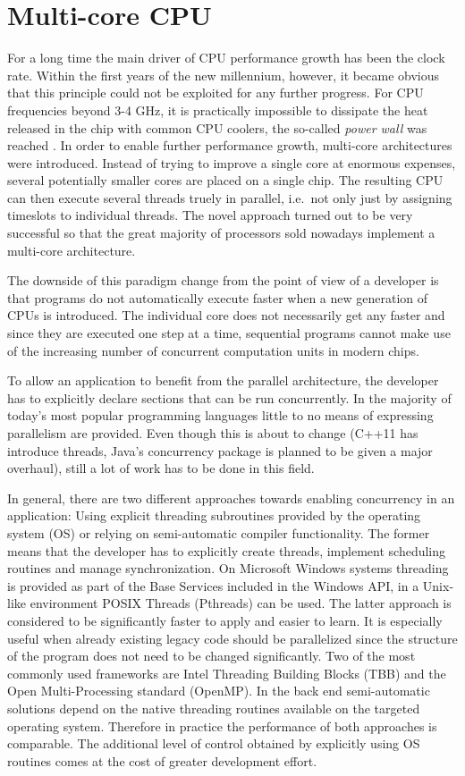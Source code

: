 \section{Multi-core CPU}
For a long time the main driver of CPU performance growth has been the clock rate. Within the first years of the new millennium, however, it became obvious that this principle could not be exploited for any further progress. For CPU frequencies beyond 3-4 GHz, it is practically impossible to dissipate the heat released in the chip with common CPU coolers, the so-called \textit{power wall} was reached \cite{kuroda_cmos_2001}. In order to enable further performance growth, multi-core architectures were introduced. Instead of trying to improve a single core at enormous expenses, several potentially smaller cores are placed on a single chip. The resulting CPU can then execute several threads truely in parallel, i.e.\ not only just by assigning timeslots to individual threads. The novel approach turned out to be very successful so that the great majority of processors sold nowadays implement a multi-core architecture. 

The downside of this paradigm change from the point of view of a developer is that programs do not automatically execute faster when a new generation of CPUs is introduced. The individual core does not necessarily get any faster and since they are executed one step at a time, sequential programs cannot make use of the increasing number of concurrent computation units in modern chips. 

To allow an application to benefit from the parallel architecture, the developer has to explicitly declare sections that can be run concurrently. In the majority of today's most popular programming languages little to no means of expressing parallelism are provided. Even though this is about to change (C++11 has introduce threads, Java's concurrency package is planned to be given a major overhaul), still a lot of work has to be done in this field. 

In general, there are two different approaches towards enabling concurrency in an application: Using explicit threading subroutines provided by the operating system (OS) or relying on semi-automatic compiler functionality. The former means that the developer has to explicitly create threads, implement scheduling routines and manage synchronization. On Microsoft Windows systems threading is provided as part of the Base Services included in the Windows API, in a Unix-like environment POSIX Threads (Pthreads) can be used. The latter approach is considered to be significantly faster to apply and easier to learn. It is especially useful when already existing legacy code should be parallelized since the structure of the program does not need to be changed significantly. Two of the most commonly used frameworks are Intel Threading Building Blocks (TBB) and the Open Multi-Processing standard (OpenMP). In the back end semi-automatic solutions depend on the native threading routines available on the targeted operating system. Therefore in practice the performance of both approaches is comparable. The additional level of control obtained by explicitly using OS routines comes at the cost of greater development effort. 

